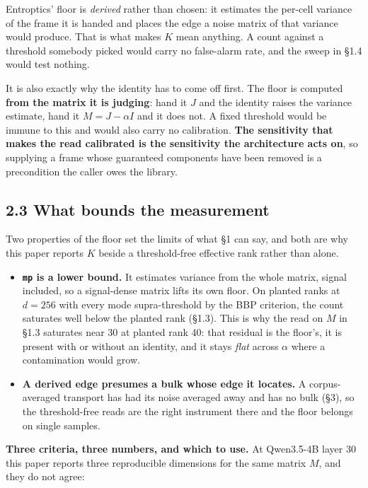 \documentclass[10pt,letterpaper,twocolumn]{article}
\providecommand{\tightlist}{\setlength{\itemsep}{0pt}\setlength{\parskip}{0pt}}
\begin{document}
Entroptics' floor is \emph{derived} rather than chosen: it estimates the per-cell variance of the frame
it is handed and places the edge a noise matrix of that variance would produce. That is what makes
\(K\) mean anything. A count against a threshold somebody picked would carry no false-alarm rate, and
the sweep in §1.4 would test nothing.

It is also exactly why the identity has to come off first. The floor is computed \textbf{from the matrix
it is judging}: hand it \(J\) and the identity raises the variance estimate, hand it \(M=J-\alpha I\)
and it does not. A fixed threshold would be immune to this and would also carry no calibration.
\textbf{The sensitivity that makes the read calibrated is the sensitivity the architecture acts on}, so
supplying a frame whose guaranteed components have been removed is a precondition the caller owes
the library.

\subsection{2.3 What bounds the measurement}\label{23-what-bounds-the-measurement}

Two properties of the floor set the limits of what §1 can say, and both are why this paper reports
\(K\) beside a threshold-free effective rank rather than alone.

\begin{itemize}
\tightlist
\item
  \textbf{\texttt{mp} is a lower bound.} It estimates variance from the whole matrix, signal included, so a
  signal-dense matrix lifts its own floor. On planted ranks at \(d=256\) with every mode
  supra-threshold by the BBP criterion, the count saturates well below the planted rank (§1.3). This is why the read on \(M\)
  in §1.3 saturates near 30 at planted rank 40: that residual is the floor's, it is present with
  or without an identity, and it stays \emph{flat} across \(\alpha\) where a contamination would grow.
\item
  \textbf{A derived edge presumes a bulk whose edge it locates.} A corpus-averaged transport has had
  its noise averaged away and has no bulk (§3), so the threshold-free reads are the right
  instrument there and the floor belongs on single samples.
\end{itemize}

\textbf{Three criteria, three numbers, and which to use.} At Qwen3.5-4B layer 30 this paper reports
three reproducible dimensions for the same matrix \(M\), and they do not agree:
\end{document}
